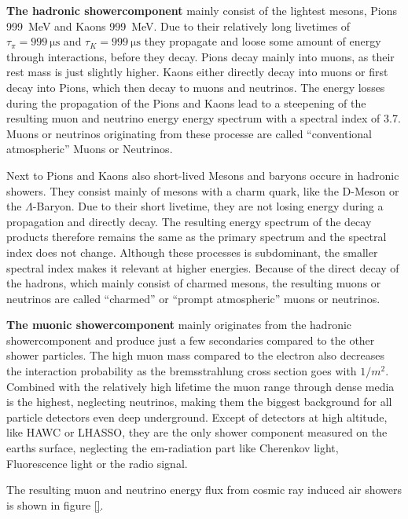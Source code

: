 \textbf{The hadronic showercomponent} mainly consist of the lightest mesons, Pions \SI{999}{MeV} and Kaons \SI{999}{MeV}.
Due to their relatively long livetimes of $\tau_\pi = \SI{999}{\micro\second}$ and $\tau_K = \SI{999}{\micro\second}$ they propagate and loose some amount of energy through interactions, before they decay.
Pions decay mainly into muons, as their rest mass is just slightly higher.
Kaons either directly decay into muons or first decay into Pions, which then decay to muons and neutrinos.
The energy losses during the propagation of the Pions and Kaons lead to a steepening of the resulting muon and neutrino energy energy spectrum with a spectral index of \num{3.7}.
Muons or neutrinos originating from these processe are called \enquote{conventional atmospheric} Muons or Neutrinos.

Next to Pions and Kaons also short-lived Mesons and baryons occure in hadronic showers.
They consist mainly of mesons with a charm quark, like the D-Meson or the $\Lambda$-Baryon.
Due to their short livetime, they are not losing energy during a propagation and directly decay.
The resulting energy spectrum of the decay products therefore remains the same as the primary spectrum and the spectral index does not change.
Although these processes is subdominant, the smaller spectral index makes it relevant at higher energies.
Because of the direct decay of the hadrons, which mainly consist of charmed mesons, the resulting muons or neutrinos are called \enquote{charmed} or \enquote{prompt atmospheric} muons or neutrinos.

\textbf{The muonic showercomponent} mainly originates from the hadronic showercomponent and produce just a few secondaries compared to the other shower particles.
The high muon mass compared to the electron also decreases the interaction probability as the bremsstrahlung cross section goes with $1/m^2$.
Combined with the relatively high lifetime the muon range through dense media is the highest, neglecting neutrinos, making them the biggest background for all particle detectors even deep underground.
Except of detectors at high altitude, like HAWC or LHASSO, they are the only shower component measured on the earths surface, neglecting the em-radiation part like Cherenkov light, Fluorescence light or the radio signal.

The resulting muon and neutrino energy flux from cosmic ray induced air showers is shown in figure \ref{}.


